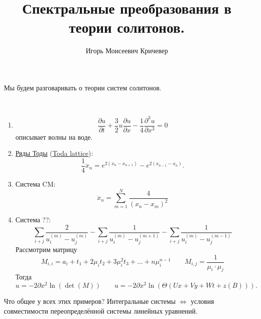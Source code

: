 \documentclass[12pt,a4paper]{article}
\title{Спектральные преобразования в теории солитонов.}
\author{Игорь Моисеевич Кричевер}
\begin{document}
    \maketitle

    Мы будем разговаривать о теории систем солитонов.

    \begin{example}\ 
        \begin{enumerate}
            \item \[\frac{\partial u}{\partial t} + \frac{3}{2} u \frac{\partial u}{\partial x} - \frac{1}{4} \frac{\partial^3 u}{\partial x^3} = 0\]
                описывает волны на воде.
            \item \href{https://ru.wikipedia.org/wiki/Цепочка_Тоды}{Ряды Тоды} (\href{https://en.wikipedia.org/wiki/Toda_lattice}{Toda lattice}): \[\frac{1}{4} \ddot{x}_n = e^{2(x_n - x_{n+1})} - e^{2(x_{n-1} - x_n)}.\]
            \item Система CM: \[\ddot{x}_n = \sum_{m=1}^N \frac{4}{(x_n - x_m)^2}\]
            \item Система ??: \[\sum_{i+j} \frac{2}{u_i^{(m)} - u_j^{(m)}} - \sum_{i+j} \frac{1}{u_i^{(m)} - u_j^{(m+1)}} - \sum_{i+j} \frac{1}{u_i^{(m)} - u_j^{(m-1)}}\]
                Рассмотрим матрицу
                \[
                    M_{i, i} = a_i + t_1 + 2 \mu_i t_2 + 3 \mu_i^2 t_3 + \dots + n \mu_i^{n-1}
                    \qquad
                    M_{i, j} = \frac{1}{\mu_i \cdot \mu_j}
                \]
                Тогда
                \[
                    u = -2 \partial x^2 \ln(\det(M))
                    \qquad
                    u = -2 \partial x^2 \ln(\Theta(Ux + Vy + Wt + z(B))).
                \]
        \end{enumerate}
    \end{example}

    Что общее у всех этих примеров? Интегральные системы $\Leftrightarrow$ условия совместимости переопределённой системы линейных уравнений.
\end{document}
